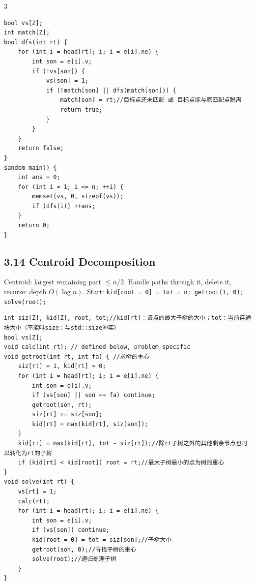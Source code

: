 \documentclass[8pt]{extarticle}
\begin{document}
\begin{multicols*}{3}
\begin{lstlisting}
bool vs[Z];
int match[Z];
bool dfs(int rt) {
    for (int i = head[rt]; i; i = e[i].ne) {
        int son = e[i].v;
        if (!vs[son]) {
            vs[son] = 1;
            if (!match[son] || dfs(match[son])) {
                match[son] = rt;//目标点还未匹配 或 目标点能与原匹配点脱离
                return true;
            }
        }
    }
    return false;
}
sandom main() {
    int ans = 0;
    for (int i = 1; i <= n; ++i) {
        memset(vs, 0, sizeof(vs));
        if (dfs(i)) ++ans;
    }
    return 0;
}
\end{lstlisting}

\subsection*{3.14 Centroid Decomposition}

Centroid: largest remaining part $\le n/2$. Handle paths through it, delete it, recurse: depth $O(\log n)$. Start: \texttt{kid[root = 0] = tot = n; getroot(1, 0); solve(root);}


\begin{lstlisting}
int siz[Z], kid[Z], root, tot;//kid[rt]：该点的最大子树的大小；tot：当前连通块大小（不能叫size：与std::size冲突）
bool vs[Z];
void calc(int rt); // defined below, problem-specific
void getroot(int rt, int fa) { //求树的重心
    siz[rt] = 1, kid[rt] = 0;
    for (int i = head[rt]; i; i = e[i].ne) {
        int son = e[i].v;
        if (vs[son] || son == fa) continue;
        getroot(son, rt);
        siz[rt] += siz[son];
        kid[rt] = max(kid[rt], siz[son]);
    }
    kid[rt] = max(kid[rt], tot - siz[rt]);//除rt子树之外的其他剩余节点也可以转化为rt的子树
    if (kid[rt] < kid[root]) root = rt;//最大子树最小的点为树的重心
}
void solve(int rt) {
    vs[rt] = 1;
    calc(rt);
    for (int i = head[rt]; i; i = e[i].ne) {
        int son = e[i].v;
        if (vs[son]) continue;
        kid[root = 0] = tot = siz[son];//子树大小
        getroot(son, 0);//寻找子树的重心
        solve(root);//递归处理子树
    }
}


\end{lstlisting}
\end{multicols*}
\end{document}

